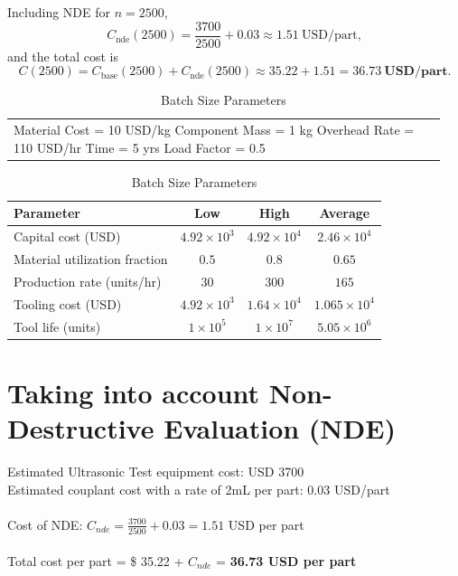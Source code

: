 \documentclass[11pt]{article}
\begin{document}
Including NDE for \(n = 2500\),
\[
C_{\text{nde}}(2500)
  = \frac{3700}{2500} + 0.03
  \approx 1.51~\text{USD/part},
\]
and the total cost is
\[
C(2500)
  = C_{\text{base}}(2500) + C_{\text{nde}}(2500)
  \approx 35.22 + 1.51
  = \mathbf{36.73~\text{USD/part}}.
\]
\begin{table}[h]
\centering
\caption{Batch Size Parameters}
\setlength{\tabcolsep}{6pt} %
\renewcommand{\arraystretch}{1.15}

\begin{tabular}{p{0.95\linewidth}}
\centering
\small
Material Cost = 10 USD/kg \quad
Component Mass = 1 kg \quad
Overhead Rate = 110 USD/hr \quad
Time = 5 yrs \quad
Load Factor = 0.5
\end{tabular}

\vspace{4pt}

\small %
\begin{tabular}{lccc}
\hline
Parameter & Low & High & Average \\
\hline
Capital cost (USD) & \(4.92\times10^{3}\) & \(4.92\times10^{4}\) & \(2.46\times10^{4}\) \\
Material utilization fraction & \(0.5\) & \(0.8\) & \(0.65\) \\
Production rate (units/hr) & \(30\) & \(300\) & \(165\) \\
Tooling cost (USD) & \(4.92\times10^{3}\) & \(1.64\times10^{4}\) & \(1.065\times10^{4}\) \\
Tool life (units) & \(1\times10^{5}\) & \(1\times10^{7}\) & \(5.05\times10^{6}\) \\
\hline
\end{tabular}
\end{table}
\section*{Taking into account Non-Destructive Evaluation (NDE)}
Estimated Ultrasonic Test equipment cost: USD 3700
\\
Estimated couplant cost with a rate of 2mL per part: 0.03 USD/part 
\\~\\
Cost of NDE: $C_{nde}=\frac{3700}{2500}+0.03 = 1.51$ USD per part
\\~\\
Total cost per part = \$ 35.22 + $C_{nde}$ = \textbf{36.73 USD per part}
\end{document}
